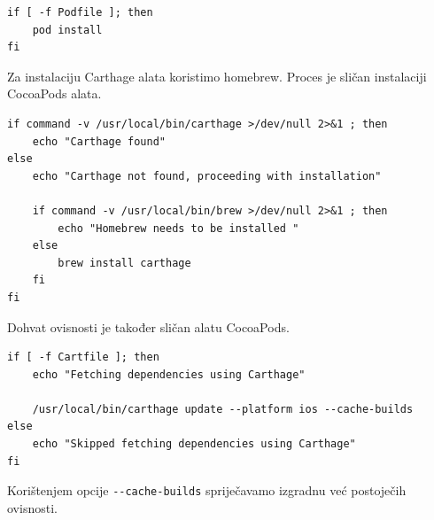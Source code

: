 \documentclass[times, utf8, diplomski, numeric]{fer}
\begin{document}
\begin{appendices}
\begin{verbatim}
if [ -f Podfile ]; then
    pod install
fi
\end{verbatim}

Za instalaciju Carthage alata koristimo homebrew. Proces je sličan instalaciji CocoaPods alata.

\begin{verbatim}
if command -v /usr/local/bin/carthage >/dev/null 2>&1 ; then
    echo "Carthage found"
else
    echo "Carthage not found, proceeding with installation"

    if command -v /usr/local/bin/brew >/dev/null 2>&1 ; then
        echo "Homebrew needs to be installed "
    else
        brew install carthage
    fi
fi
\end{verbatim}

Dohvat ovisnosti je također sličan alatu CocoaPods.

\begin{verbatim}
if [ -f Cartfile ]; then
    echo "Fetching dependencies using Carthage"

    /usr/local/bin/carthage update --platform ios --cache-builds
else
    echo "Skipped fetching dependencies using Carthage"
fi
\end{verbatim}

Korištenjem opcije \verb|--cache-builds| spriječavamo izgradnu već postoječih ovisnosti.
















\end{appendices}
\end{document}
